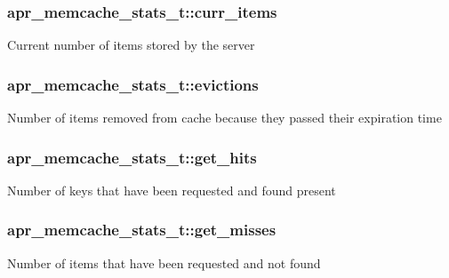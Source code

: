 \subsubsection[{\texorpdfstring{curr\+\_\+items}{curr_items}}]{ apr\+\_\+memcache\+\_\+stats\+\_\+t\+::curr\+\_\+items}\hypertarget{structapr__memcache__stats__t_abe0f28297441a55d30a6c7c8e0faaea3}{}\label{structapr__memcache__stats__t_abe0f28297441a55d30a6c7c8e0faaea3}
Current number of items stored by the server 
\subsubsection[{\texorpdfstring{evictions}{evictions}}]{ apr\+\_\+memcache\+\_\+stats\+\_\+t\+::evictions}\hypertarget{structapr__memcache__stats__t_ad430486ea11c0e5f7b70c9c2b95a216c}{}\label{structapr__memcache__stats__t_ad430486ea11c0e5f7b70c9c2b95a216c}
Number of items removed from cache because they passed their expiration time 
\subsubsection[{\texorpdfstring{get\+\_\+hits}{get_hits}}]{ apr\+\_\+memcache\+\_\+stats\+\_\+t\+::get\+\_\+hits}\hypertarget{structapr__memcache__stats__t_a6d3b60bc77c024259a2e9dfb1e35bfd7}{}\label{structapr__memcache__stats__t_a6d3b60bc77c024259a2e9dfb1e35bfd7}
Number of keys that have been requested and found present 
\subsubsection[{\texorpdfstring{get\+\_\+misses}{get_misses}}]{ apr\+\_\+memcache\+\_\+stats\+\_\+t\+::get\+\_\+misses}\hypertarget{structapr__memcache__stats__t_affaa2901db1db585fca3cfa77fcb0230}{}\label{structapr__memcache__stats__t_affaa2901db1db585fca3cfa77fcb0230}
Number of items that have been requested and not found 
